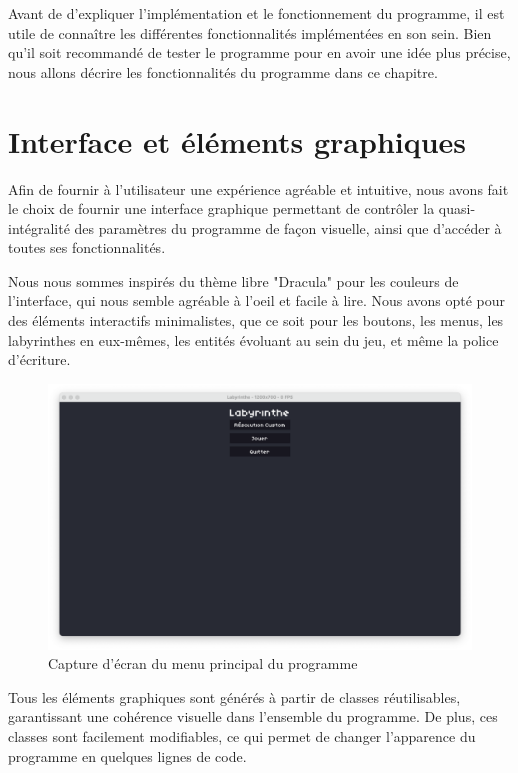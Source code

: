 \documentclass[12pt]{scrreprt} %
\begin{document}
Avant de d'expliquer l'implémentation et le fonctionnement du programme, il est utile de connaître les différentes fonctionnalités implémentées en son sein. Bien qu'il soit recommandé de tester le programme pour en avoir une idée plus précise, nous allons décrire les fonctionnalités du programme dans ce chapitre.

\section{Interface et éléments graphiques}

Afin de fournir à l'utilisateur une expérience agréable et intuitive, nous avons fait le choix de fournir une interface graphique permettant de contrôler la quasi-intégralité des paramètres du programme de façon visuelle, ainsi que d'accéder à toutes ses fonctionnalités.

Nous nous sommes inspirés du thème libre "Dracula"\cite{Dracula2024} pour les couleurs de l'interface, qui nous semble agréable à l'oeil et facile à lire. Nous avons opté pour des éléments interactifs minimalistes, que ce soit pour les boutons, les menus, les labyrinthes en eux-mêmes, les entités évoluant au sein du jeu, et même la police d'écriture.



\begin{figure}[h]
    \centering
    \includegraphics[width=\textwidth]{images/mainmenu.png}
    \caption{Capture d'écran du menu principal du programme}
\end{figure}

Tous les éléments graphiques sont générés à partir de classes réutilisables, garantissant une cohérence visuelle dans l'ensemble du programme. De plus, ces classes sont facilement modifiables, ce qui permet de changer l'apparence du programme en quelques lignes de code.
\end{document}

